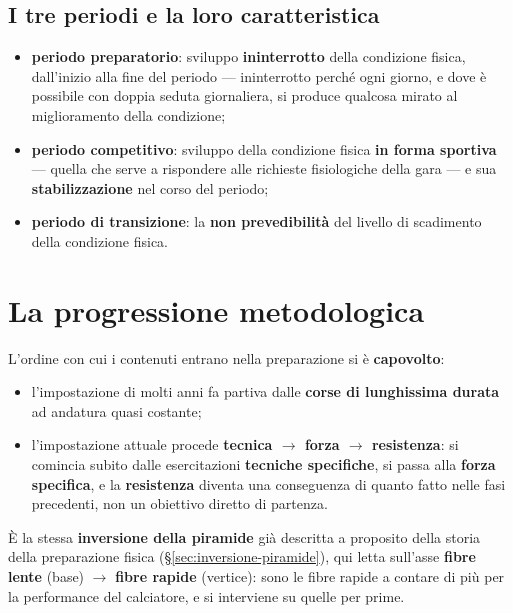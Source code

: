 \subsection{I tre periodi e la loro caratteristica}

\begin{itemize}
  \item \textbf{periodo preparatorio}: sviluppo \textbf{ininterrotto} della condizione fisica,
    dall'inizio alla fine del periodo --- ininterrotto perché ogni giorno, e dove è possibile con
    doppia seduta giornaliera, si produce qualcosa mirato al miglioramento della condizione;
  \item \textbf{periodo competitivo}: sviluppo della condizione fisica \textbf{in forma sportiva} ---
    quella che serve a rispondere alle richieste fisiologiche della gara --- e sua
    \textbf{stabilizzazione} nel corso del periodo;
  \item \textbf{periodo di transizione}: la \textbf{non prevedibilità} del livello di scadimento
    della condizione fisica.
\end{itemize}

\section{La progressione metodologica}

L'ordine con cui i contenuti entrano nella preparazione si è \textbf{capovolto}:

\begin{itemize}
  \item l'impostazione di molti anni fa partiva dalle \textbf{corse di lunghissima durata} ad
    andatura quasi costante;
  \item l'impostazione attuale procede \textbf{tecnica $\rightarrow$ forza $\rightarrow$
    resistenza}: si comincia subito dalle esercitazioni \textbf{tecniche specifiche}, si passa alla
    \textbf{forza specifica}, e la \textbf{resistenza} diventa una conseguenza di quanto fatto nelle
    fasi precedenti, non un obiettivo diretto di partenza.
\end{itemize}

È la stessa \textbf{inversione della piramide} già descritta a proposito della storia della
preparazione fisica (§\ref{sec:inversione-piramide}), qui letta sull'asse
\textbf{fibre lente} (base) $\rightarrow$ \textbf{fibre rapide} (vertice): sono le fibre rapide a
contare di più per la performance del calciatore, e si interviene su quelle per prime.

